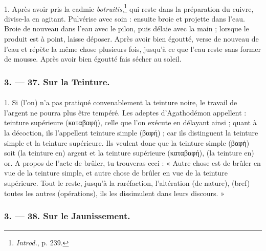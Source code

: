 \documentclass[landscape, a4paper, 11pt, oneside, polutonikogreek, french]{article}
\begin{document}
\paragraph{}
1. Après avoir pris la cadmie \emph{botruitis},\footnote{\emph{Introd.}, p. 239.} qui reste dans la préparation du cuivre, divise-la en agitant. Pulvérise avec soin : ensuite broie et projette dans l'eau. Broie de nouveau dans l'eau avec le pilon, puis délaie avec la main ; lorsque le produit est à point, laisse déposer. Après avoir bien égoutté, verse de nouveau de l'eau et répète la même chose plusieurs fois, jusqu'à ce que l'eau reste sans former de mousse. Après avoir bien égoutté fais sécher au soleil.

\bigskip
\centerline{\EightStarTaper}
\centerline{\EightStarTaper\EightStarTaper}
\bigskip

\subsubsection{3. --- 37. Sur la Teinture.}
\paragraph{}
1. Si (l'on) n'a pas pratiqué convenablement la teinture noire, le travail de l'argent ne pourra plus être tempéré. Les adeptes d'Agathodémon appellent : teinture supérieure (καταβαφή), celle que l'on exécute en délayant ainsi ; quant à la décoction, ils l'appellent teinture simple (βαφή) ; car ils distinguent la teinture simple et la teinture supérieure. Ils veulent donc que la teinture simple (βαφή) soit (la teinture en) argent et la teinture supérieure (καταβαφή), (la teinture en) or. A propos de l'acte de brûler, tu trouveras ceci : « Autre chose est de brûler en vue de la teinture simple, et autre chose de brûler en vue de la teinture supérieure. Tout le reste, jusqu'à la raréfaction, l'altération (de nature), (bref) toutes les autres (opérations), ils les dissimulent dans leurs discours. »

\bigskip
\centerline{\EightStarTaper}
\centerline{\EightStarTaper\EightStarTaper}
\bigskip

\subsubsection{3. --- 38. Sur le Jaunissement.}
\end{document}
